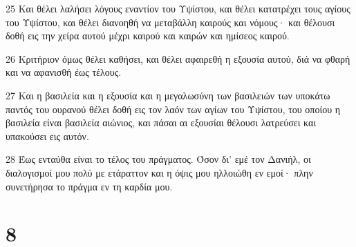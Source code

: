 \par 25 Και θέλει λαλήσει λόγους εναντίον του Υψίστου, και θέλει κατατρέχει τους αγίους του Υψίστου, και θέλει διανοηθή να μεταβάλλη καιρούς και νόμους· και θέλουσι δοθή εις την χείρα αυτού μέχρι καιρού και καιρών και ημίσεος καιρού.
\par 26 Κριτήριον όμως θέλει καθήσει, και θέλει αφαιρεθή η εξουσία αυτού, διά να φθαρή και να αφανισθή έως τέλους.
\par 27 Και η βασιλεία και η εξουσία και η μεγαλωσύνη των βασιλειών των υποκάτω παντός του ουρανού θέλει δοθή εις τον λαόν των αγίων του Υψίστου, του οποίου η βασιλεία είναι βασιλεία αιώνιος, και πάσαι αι εξουσίαι θέλουσι λατρεύσει και υπακούσει εις αυτόν.
\par 28 Έως ενταύθα είναι το τέλος του πράγματος. Όσον δι' εμέ τον Δανιήλ, οι διαλογισμοί μου πολύ με ετάραττον και η όψις μου ηλλοιώθη εν εμοί· πλην συνετήρησα το πράγμα εν τη καρδία μου.

\chapter{8}

